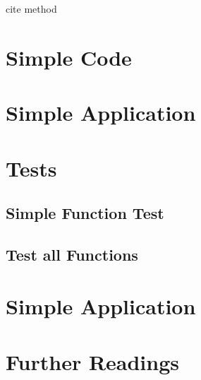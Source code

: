 cite method

\section{Simple Code}


\section{Simple Application}



\section{Tests}

\subsection{Simple Function Test}

\subsection{Test all Functions}

\section{Simple Application}


\section{Further Readings}

